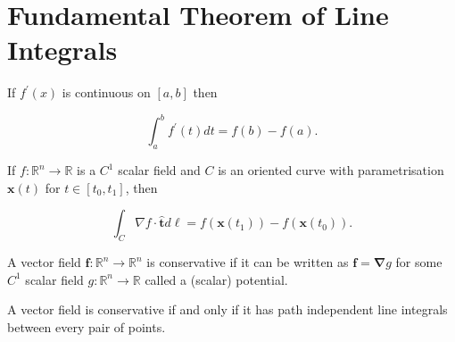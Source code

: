 \section{Fundamental Theorem of Line Integrals}

\begin{theorem}
  If \(f^{\prime}(x)\) is continuous on \([a, b]\) then

\[
\int_a^b f^{\prime}(t) d t=f(b)-f(a) .
\]
\end{theorem}

\begin{theorem}
  If \(f: \mathbb{R}^n \rightarrow \mathbb{R}\) is a \(C^1\) scalar field and \(C\) is an oriented curve with parametrisation \(\boldsymbol{x}(t)\) for \(t \in\left[t_0, t_1\right]\), then

\[
\int_C \nabla f \cdot \hat{\boldsymbol{t}} d \ell=f\left(\boldsymbol{x}\left(t_1\right)\right)-f\left(\boldsymbol{x}\left(t_0\right)\right) .
\]
\end{theorem}

\begin{proofidea}
  
  
\begin{formalproof}
  
\end{formalproof}
  
\end{proofidea} 

\begin{definition}
  A vector field \(\boldsymbol{f}: \mathbb{R}^n \rightarrow \mathbb{R}^n\) is conservative if it can be written as \(\boldsymbol{f}=\boldsymbol{\nabla} g\) for some \(C^1\) scalar field \(g: \mathbb{R}^n \rightarrow \mathbb{R}\) called a (scalar) potential.
\end{definition}

\begin{proposition}
  A vector field is conservative if and only if it has path independent line integrals between every pair of points.
\end{proposition}

\begin{proofidea}
  
  
\begin{formalproof}
  
\end{formalproof}
  
\end{proofidea}

